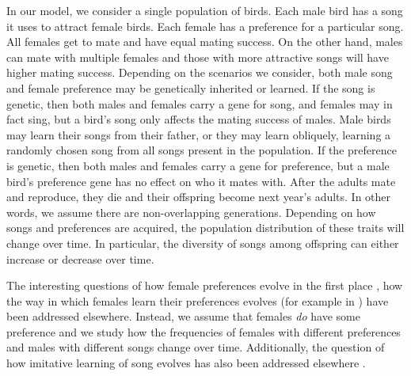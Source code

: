 \documentclass[12pt]{article}
\begin{document}
In our model, we consider a single population of birds. Each male bird has a song it uses to attract female birds. Each female has a preference for a particular song. All females get to mate and have equal mating success. On the other hand, males can mate with multiple females and those with more attractive songs will have higher mating success. Depending on the scenarios we consider, both male song and female preference may be genetically inherited or learned. If the song is genetic, then both males and females carry a gene for song, and females may in fact sing, but a bird's song only affects the mating success of males. Male birds may learn their songs from their father, or they may learn obliquely, learning a randomly chosen song from all songs present in the population. If the preference is genetic, then both males and females carry a gene for preference, but a male bird's preference gene has no effect on who it mates with. After the adults mate and reproduce, they die and their offspring become next year's adults. In other words, we assume there are non-overlapping generations. Depending on how songs and preferences are acquired, the population distribution of these traits will change over time. In particular, the diversity of songs among offspring can either increase or decrease over time.

The interesting questions of how female preferences evolve in the first place \cite{Kirkpatrick:1982kl}, how the way in which females learn their preferences evolves (for example in \cite{Tramm:2008ij,Chaffee:2013bs}) have been addressed elsewhere. Instead, we assume that females \emph{do} have some preference and we study how the frequencies of females with different preferences and males with different songs change over time. Additionally, the question of how imitative learning of song evolves has also been addressed elsewhere \cite{Aoki:1989bh,Olofsson:2008dq}. 
\end{document}
